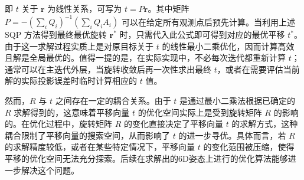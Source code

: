 即 $t$ 关于 $\mathbf{r}$ 为线性关系，可写为 $t = P \mathbf{r}$。其中矩阵 $P = -(\sum_i Q_i)^{-1}(\sum_i Q_i A_i)$ 可以在给定所有观测点后预先计算。当利用上述 SQP 方法得到最终最优旋转 $\mathbf{r}^*$ 时，只需代入此公式即可得到对应的最优平移 $t^*$。由于这一求解过程实质上是对原目标关于 $t$ 的线性最小二乘优化，因而计算高效且解是全局最优的。值得一提的是，在实际实现中，不必每次迭代都重新计算 $t$；通常可以在主迭代外层，当旋转收敛后再一次性求出最终 $t$，或者在需要评估当前解的实际投影误差时临时计算相应的 $t$ 值。

然而，$R$ 与 $t$ 之间存在一定的耦合关系。由于 $t$ 是通过最小二乘法根据已确定的 $R$ 求解得到的，这意味着平移向量 $t$ 的优化空间实际上是受到旋转矩阵 $R$ 的影响的。在优化过程中，旋转矩阵 $R$ 的变化直接决定了平移向量 $t$ 的求解方式，这种耦合限制了平移向量的搜索空间，从而影响了 $t$ 的进一步寻优。具体而言，若 $R$ 的求解精度较低，或者在某些特定情况下，平移向量 $t$ 的变化范围被压缩，使得平移的优化空间无法充分探索。后续在求解出的6D姿态上进行的优化算法能够进一步解决这个问题。
